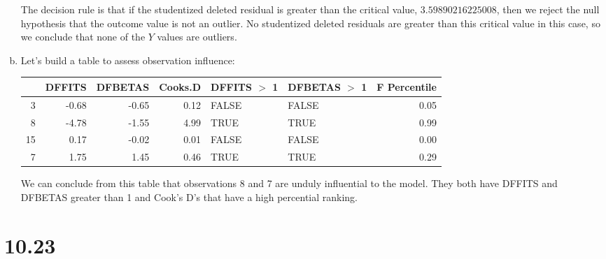 \documentclass{article}
\begin{document}
\begin{enumerate}[a)]
The decision rule is that if the studentized deleted residual is greater than the critical value, $3.59890216225008$, then we reject the null hypothesis that the outcome value is not an outlier. No studentized deleted residuals are greater than this critical value in this case, so we conclude that none of the $Y$ values are outliers.

\item{} Let's build a table to assess observation influence:
\begin{Schunk}
\begin{table}[ht]
\centering
\begin{tabular}{rrrrllr}
  \hline
 & DFFITS & DFBETAS & Cooks.D & DFFITS $>$ 1 & DFBETAS $>$ 1 & F Percentile \\ 
  \hline
3 & -0.68 & -0.65 & 0.12 & FALSE & FALSE & 0.05 \\ 
  8 & -4.78 & -1.55 & 4.99 & TRUE & TRUE & 0.99 \\ 
  15 & 0.17 & -0.02 & 0.01 & FALSE & FALSE & 0.00 \\ 
  7 & 1.75 & 1.45 & 0.46 & TRUE & TRUE & 0.29 \\ 
   \hline
\end{tabular}
\end{table}\end{Schunk}

We can conclude from this table that observations 8 and 7 are unduly influential to the model. They both have DFFITS and DFBETAS greater than 1 and Cook's D's that have a high percential ranking.

\end{enumerate}

\section{10.23}
\end{document}
